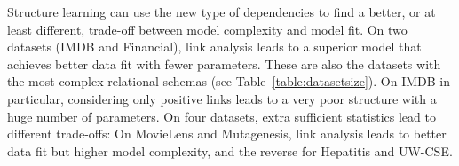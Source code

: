 \documentclass{sig-alternate-2013}
\begin{document}
\begin{table}[htb]
\begin{center}
\end{center}
\caption{Comparison of Statistical Performance of Bayesian Network Learning.
}
\label{table:result_scores}
\end{table}




Structure learning can use the new type of dependencies to find a better, or at least different, trade-off between model complexity and model fit.
On two datasets (IMDB and Financial), link analysis leads to a superior model that achieves better data fit with fewer parameters. These are also the datasets with the most complex relational schemas (see Table~\ref{table:datasetsize}). On IMDB in particular, considering only positive links leads to a very poor structure with a huge number of parameters.
On four datasets, extra sufficient statistics lead to different trade-offs: On MovieLens and Mutagenesis, link analysis leads to better data fit but higher model complexity, and the reverse for Hepatitis and UW-CSE. 


\end{document}
